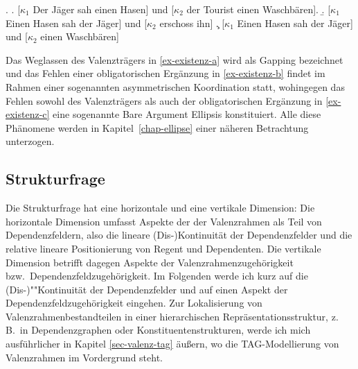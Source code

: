 \ex. \label{ex-existenz}
\a. \label{ex-existenz-a} [$\kappa_1$ Der Jäger sah einen Hasen] und [$\kappa_2$ der Tourist einen Waschbären].
\b. \label{ex-existenz-b} [$\kappa_1$ Einen Hasen sah der Jäger] und [$\kappa_2$ erschoss ihn]
\c. \label{ex-existenz-c} [$\kappa_1$ Einen Hasen sah der Jäger] und [$\kappa_2$ einen Waschbären]

Das Weglassen des Valenzträgers in \ref{ex-existenz-a} wird als Gapping bezeichnet und das Fehlen einer obligatorischen Ergänzung in \ref{ex-existenz-b} findet im Rahmen einer sogenannten asymmetrischen Koordination statt, wohingegen das Fehlen sowohl des Valenzträgers als auch der obligatorischen Ergänzung in \ref{ex-existenz-c} eine sogenannte Bare Argument Ellipsis konstituiert. Alle diese Phänomene werden in Kapitel~\ref{chap-ellipse} einer näheren Betrachtung unterzogen.



\subsection{Strukturfrage} \label{sec-strukturfrage}

Die Strukturfrage hat eine horizontale und eine vertikale Dimension: Die horizontale Dimension umfasst Aspekte der  der Valenzrahmen als Teil von Dependenzfeldern, also die lineare (Dis-)Kontinuität der Dependenzfelder und die relative lineare Positionierung von Regent und Dependenten. Die vertikale Dimension betrifft dagegen Aspekte der Valenzrahmenzugehörigkeit bzw.\ Dependenzfeldzugehörigkeit. Im Folgenden werde ich kurz auf die (Dis-)""Kontinuität der Dependenzfelder und auf einen Aspekt der Dependenzfeldzugehörigkeit eingehen. Zur Lokalisierung von Valenzrahmenbestandteilen in einer hierarchischen Repräsentationsstruktur, z.\,B.\ in Dependenzgraphen oder Konstituentenstrukturen, werde ich mich ausführlicher in Kapitel \ref{sec-valenz-tag} äu\ss ern, wo die TAG-Modellierung von Valenzrahmen im Vordergrund steht.

